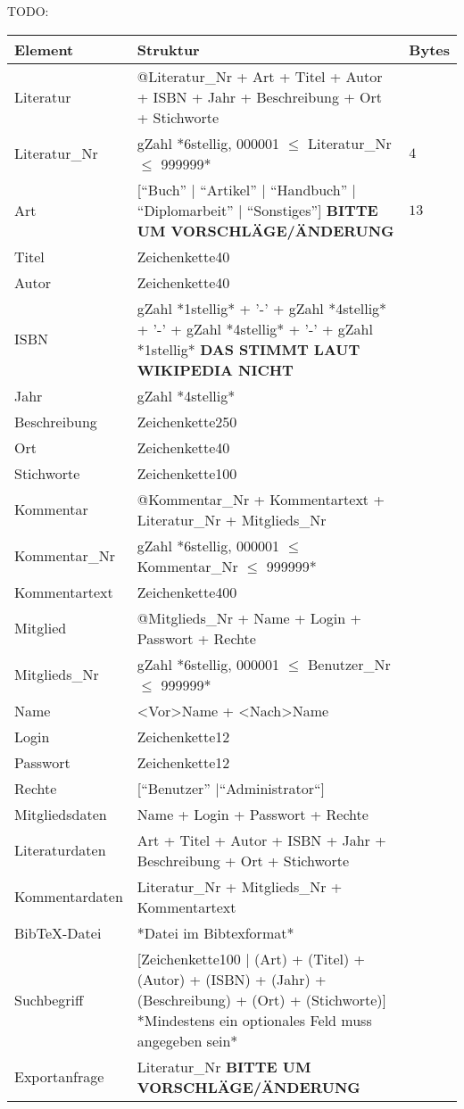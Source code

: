 TODO:\\
\begin{longtable}{|l|p{6.0cm}|p{2cm}|}
\hline
Element & Struktur & Bytes\\
\hline\hline
\endhead

Literatur & @Literatur\_Nr + Art + Titel + Autor + ISBN + Jahr + Beschreibung + Ort + Stichworte \\
\hline
Literatur\_Nr & gZahl *6stellig, 000001 $\leq$ Literatur\_Nr $\leq$ 999999*  & $4$\\
\hline
Art & [``Buch'' | ``Artikel'' | ``Handbuch'' | ``Diplomarbeit'' | ``Sonstiges''] \textbf{BITTE UM VORSCHLÄGE/ÄNDERUNG}  & $13$\\
\hline
Titel & Zeichenkette40 \\
\hline
Autor & Zeichenkette40 \\
\hline
ISBN & gZahl *1stellig* + '-' + gZahl *4stellig* + '-' + gZahl *4stellig* + '-' + gZahl *1stellig* \textbf{DAS STIMMT LAUT WIKIPEDIA NICHT}\\
\hline
Jahr & gZahl *4stellig* \\
\hline
Beschreibung & Zeichenkette250 \\
\hline
Ort & Zeichenkette40 \\
\hline
Stichworte & Zeichenkette100 \\
\hline\hline

Kommentar & @Kommentar\_Nr + Kommentartext + Literatur\_Nr + Mitglieds\_Nr\\
\hline
Kommentar\_Nr & gZahl *6stellig, 000001 $\leq$ Kommentar\_Nr $\leq$ 999999* \\
\hline
Kommentartext & Zeichenkette400 \\
\hline\hline

Mitglied  & @Mitglieds\_Nr  + Name + Login + Passwort + Rechte\\
\hline
Mitglieds\_Nr & gZahl *6stellig, 000001 $\leq$ Benutzer\_Nr $\leq$ 999999* \\ 
\hline
Name & <Vor>Name + <Nach>Name \\
\hline
Login & Zeichenkette12 \\
\hline
Passwort & Zeichenkette12 \\
\hline
Rechte & [``Benutzer'' $\mid $``Administrator``] \\
\hline\hline

Mitgliedsdaten & Name + Login + Passwort + Rechte \\
\hline
Literaturdaten & Art + Titel + Autor + ISBN + Jahr + Beschreibung + Ort + Stichworte \\
\hline
Kommentardaten & Literatur\_Nr + Mitglieds\_Nr + Kommentartext \\
\hline
BibTeX-Datei & *Datei im Bibtexformat* \\
\hline
Suchbegriff & [Zeichenkette100 | (Art) + (Titel) + (Autor) + (ISBN) + (Jahr) + (Beschreibung) + (Ort) + (Stichworte)] *Mindestens ein optionales Feld muss angegeben sein* \\
\hline
Exportanfrage & Literatur\_Nr \textbf{BITTE UM VORSCHLÄGE/ÄNDERUNG} \\
\hline\hline


\end{longtable}
